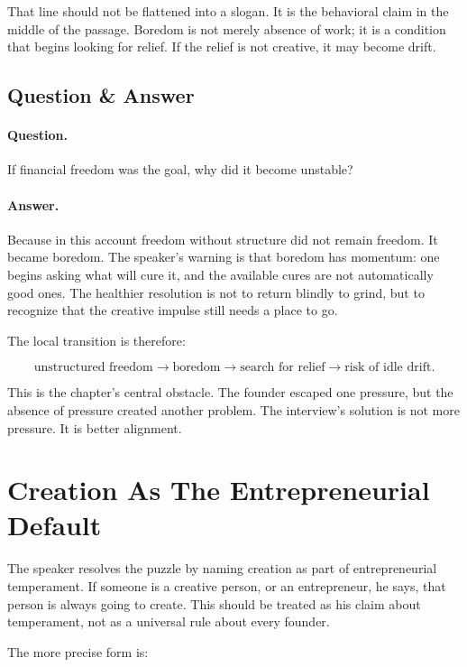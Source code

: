 That line should not be flattened into a slogan. It is the behavioral claim in the middle of the passage. Boredom is not merely absence of work; it is a condition that begins looking for relief. If the relief is not creative, it may become drift.

\subsection{Question \& Answer}

\paragraph{Question.}
If financial freedom was the goal, why did it become unstable?

\paragraph{Answer.}
Because in this account freedom without structure did not remain freedom. It became boredom. The speaker's warning is that boredom has momentum: one begins asking what will cure it, and the available cures are not automatically good ones. The healthier resolution is not to return blindly to grind, but to recognize that the creative impulse still needs a place to go.

The local transition is therefore:

\begin{equation}
\text{unstructured freedom}
\longrightarrow
\text{boredom}
\longrightarrow
\text{search for relief}
\longrightarrow
\text{risk of idle drift}.
\end{equation}

This is the chapter's central obstacle. The founder escaped one pressure, but the absence of pressure created another problem. The interview's solution is not more pressure. It is better alignment.

\section{Creation As The Entrepreneurial Default}

The speaker resolves the puzzle by naming creation as part of entrepreneurial temperament. If someone is a creative person, or an entrepreneur, he says, that person is always going to create. This should be treated as his claim about temperament, not as a universal rule about every founder.

The more precise form is:

